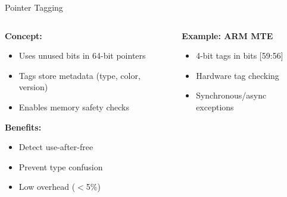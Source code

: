\documentclass[aspectratio=169,12pt]{beamer}
\begin{document}
\begin{frame}{Pointer Tagging}
    \begin{columns}
        \begin{column}{0.5\textwidth}
            \textbf{Concept:}
            \begin{itemize}
                \item Uses unused bits in 64-bit pointers
                \item Tags store metadata (type, color, version)
                \item Enables memory safety checks
            \end{itemize}
            
            \vspace{0.5cm}
            \textbf{Benefits:}
            \begin{itemize}
                \item Detect use-after-free
                \item Prevent type confusion
                \item Low overhead ($<$5\%)
            \end{itemize}
        \end{column}
        \begin{column}{0.5\textwidth}
            
            \vspace{0.5cm}
            \textbf{Example: ARM MTE}
            \begin{itemize}
                \item 4-bit tags in bits [59:56]
                \item Hardware tag checking
                \item Synchronous/async exceptions
            \end{itemize}
        \end{column}
    \end{columns}
\end{frame}
\end{document}
